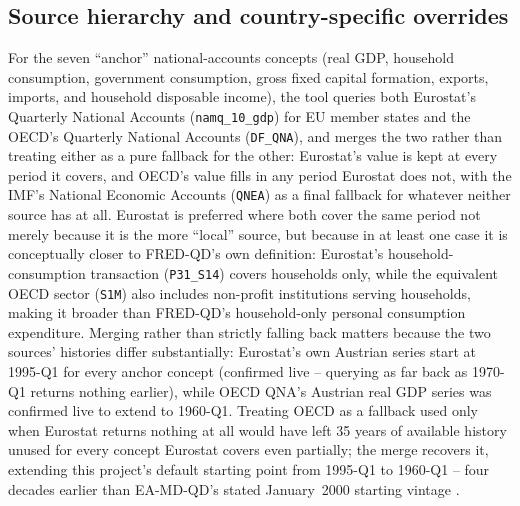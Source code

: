 \documentclass[11pt]{article}
\begin{document}
\subsection{Source hierarchy and country-specific overrides}
\label{sec:overrides}

For the seven ``anchor'' national-accounts concepts (real GDP, household
consumption, government consumption, gross fixed capital formation,
exports, imports, and household disposable income), the tool queries both
Eurostat's Quarterly National Accounts (\texttt{namq\_10\_gdp}) for EU
member states and the OECD's Quarterly National Accounts
(\texttt{DF\_QNA}), and merges the two rather than treating either as a
pure fallback for the other: Eurostat's value is kept at every period it
covers, and OECD's value fills in any period Eurostat does not, with the
IMF's National Economic Accounts (\texttt{QNEA}) as a final fallback for
whatever neither source has at all. Eurostat is preferred where both
cover the same period not merely because it is the more ``local'' source,
but because in at least one case it is conceptually closer to FRED-QD's
own definition: Eurostat's household-consumption transaction
(\texttt{P31\_S14}) covers households only, while the equivalent OECD
sector (\texttt{S1M}) also includes non-profit institutions serving
households, making it broader than FRED-QD's household-only personal
consumption expenditure. Merging rather than strictly falling back
matters because the two sources' histories differ substantially:
Eurostat's own Austrian series start at 1995-Q1 for every anchor concept
(confirmed live -- querying as far back as 1970-Q1 returns nothing
earlier), while OECD QNA's Austrian real GDP series was confirmed live to
extend to 1960-Q1. Treating OECD as a fallback used only when Eurostat
returns nothing at all would have left 35 years of available history
unused for every concept Eurostat covers even partially; the merge
recovers it, extending this project's default starting point from
1995-Q1 to 1960-Q1 -- four decades earlier than EA-MD-QD's stated
January~2000 starting vintage \citep{barigozzi2024eamdqd}.
\end{document}
